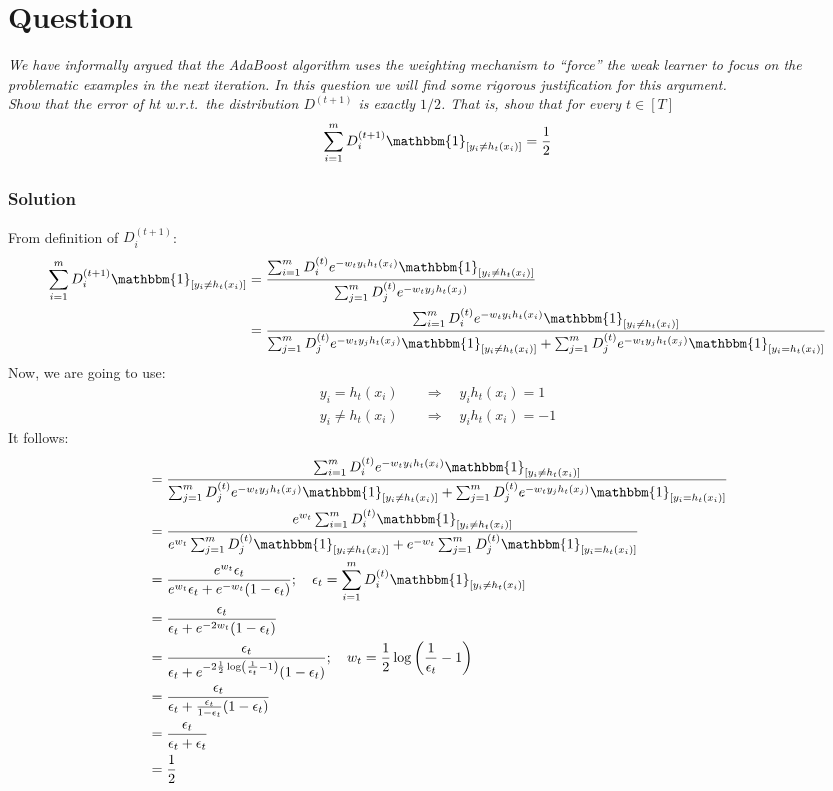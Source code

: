 \documentclass{article}
\newcounter{counterquestion}
\newenvironment{question}[1]
{
\stepcounter{counterquestion}
\section*{Question \thecounterquestion}
\emph{#1} 
} 
{
}
\newenvironment{solution}
{
\subsubsection*{Solution}
} 
{
}
\begin{document}
\begin{question}{We have informally argued that the AdaBoost algorithm uses the weighting
mechanism to “force” the weak learner to focus on the problematic examples in the next iteration. In this question we will find some rigorous justification for this argument. \\ Show that the error of ht w.r.t.\ the distribution $D^{(t+1)}$ is exactly $1/2$. That is, show that for every $t \in [T]$ 
\[
\sum_{i = 1}^m D_i^{(t + 1)} \mathbbm{1}_{[y_i \neq h_t(x_i)]} = \frac{1}{2}
\]}
\begin{solution}
From definition of $D_i^{(t + 1)}$:
\begin{align*}
\sum_{i = 1}^m D_i^{(t + 1)} \mathbbm{1}_{[y_i \neq h_t(x_i)]} & = \frac{\sum_{i = 1}^m D_i^{(t)}e^{-w_t y_i h_t(x_i)} \mathbbm{1}_{[y_i \neq h_t(x_i)]}}{\sum_{j = 1}^{m} D_j^{(t)} e^{-w_t y_j h_t(x_j)}} \\
& = \frac{\sum_{i = 1}^m D_i^{(t)}e^{-w_t y_i h_t(x_i)} \mathbbm{1}_{[y_i \neq h_t(x_i)]}}{\sum_{j = 1}^{m} D_j^{(t)} e^{-w_t y_j h_t(x_j)}\mathbbm{1}_{[y_i \neq h_t(x_i)]} + \sum_{j = 1}^{m} D_j^{(t)} e^{-w_t y_j h_t(x_j)}\mathbbm{1}_{[y_i = h_t(x_i)]}}
\end{align*}
Now, we are going to use:
\begin{align*}
y_i = h_t(x_i) & \quad \Rightarrow \quad y_i h_t(x_i) = 1 \\
y_i \neq h_t(x_i) & \quad \Rightarrow \quad y_i h_t(x_i) = -1
\end{align*}
It follows:
\begin{align*}
& = \frac{\sum_{i = 1}^m D_i^{(t)}e^{-w_t y_i h_t(x_i)} \mathbbm{1}_{[y_i \neq h_t(x_i)]}}{\sum_{j = 1}^{m} D_j^{(t)} e^{-w_t y_j h_t(x_j)}\mathbbm{1}_{[y_i \neq h_t(x_i)]} + \sum_{j = 1}^{m} D_j^{(t)} e^{-w_t y_j h_t(x_j)}\mathbbm{1}_{[y_i = h_t(x_i)]}} \\
& = \frac{e^{w_t} \sum_{i = 1}^m D_i^{(t)} \mathbbm{1}_{[y_i \neq h_t(x_i)]}}{e^{w_t} \sum_{j = 1}^{m} D_j^{(t)} \mathbbm{1}_{[y_i \neq h_t(x_i)]} + e^{-w_t} \sum_{j = 1}^{m} D_j^{(t)} \mathbbm{1}_{[y_i = h_t(x_i)]}} \\
& = \frac{e^{w_t} \epsilon_t}{e^{w_t}\epsilon_t + e^{-w_t}(1 - \epsilon_t)}; \quad \epsilon_t = \sum_{i = 1}^m D_i^{(t)} \mathbbm{1}_{[y_i \neq h_t(x_i)]} \\
& = \frac{\epsilon_t}{\epsilon_t + e^{-2w_t}(1 - \epsilon_t)} \\
& = \frac{\epsilon_t}{\epsilon_t + e^{-2 \frac{1}{2} \log \left( \frac{1}{\epsilon_t} - 1 \right)}(1 - \epsilon_t)}; \quad w_t = \frac{1}{2} \log \left( \frac{1}{\epsilon_t} - 1 \right) \\
& = \frac{\epsilon_t}{\epsilon_t + \frac{\epsilon_t}{1 - \epsilon_t}(1 - \epsilon_t)} \\
& = \frac{\epsilon_t}{\epsilon_t + \epsilon_t} \\
& = \frac{1}{2}
\end{align*} 
\end{solution}
\end{question}
\end{document}

